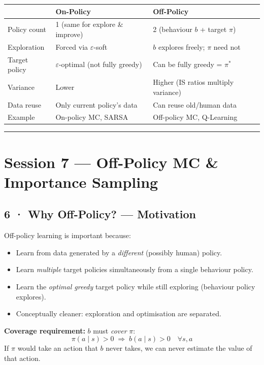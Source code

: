 \documentclass[11pt,a4paper]{article}
\begin{document}
\begin{center}\small
\begin{tabular}{p{3.5cm}p{5cm}p{5.5cm}}
\toprule
& \textbf{On-Policy} & \textbf{Off-Policy} \\
\midrule
Policy count & 1 (same for explore \& improve) & 2 (behaviour $b$ + target $\pi$) \\
Exploration & Forced via $\varepsilon$-soft & $b$ explores freely; $\pi$ need not \\
Target policy & $\varepsilon$-optimal (not fully greedy) & Can be fully greedy = $\pi^*$ \\
Variance & Lower & Higher (IS ratios multiply variance) \\
Data reuse & Only current policy's data & Can reuse old/human data \\
Example & On-policy MC, SARSA & Off-policy MC, Q-Learning \\
\bottomrule
\end{tabular}
\end{center}

\hrule\vspace{8pt}

\section*{Session 7 — Off-Policy MC \& Importance Sampling}

\subsection*{6 · Why Off-Policy? — Motivation}

Off-policy learning is important because:
\begin{itemize}
  \item Learn from data generated by a \emph{different} (possibly human) policy.
  \item Learn \emph{multiple} target policies simultaneously from a single behaviour policy.
  \item Learn the \emph{optimal greedy} target policy while still exploring (behaviour policy explores).
  \item Conceptually cleaner: exploration and optimisation are separated.
\end{itemize}

\textbf{Coverage requirement:} $b$ must \emph{cover} $\pi$:
\[
  \pi(a \mid s) > 0 \;\Rightarrow\; b(a \mid s) > 0 \quad \forall s, a
\]
If $\pi$ would take an action that $b$ never takes, we can never estimate the value of that action.
\end{document}
